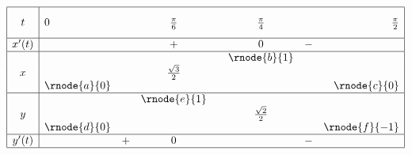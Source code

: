 \documentclass[12pt,a4paper]{article}
\begin{document}
$$
\begin{array}{|c|lcccccr|}
\hline
\rule[-4mm]{0mm}{10mm}t&0& &\frac{\pi}{6}& &\frac{\pi}{4}& &\frac{\pi}{2}\\
\hline
x'(t)& & &+& &0&-& \\
\hline
 & & & & &\rnode{b}{1}& & \\
x& & &\frac{\sqrt{3}}{2}& & & & \\
 &\rnode{a}{0}& & & & & &\rnode{c}{0}\\
\hline
 & & &\rnode{e}{1}& & & & \\
y& & & & &\frac{\sqrt{2}}{2}& & \\
 &\rnode{d}{0}& & & & & &\rnode{f}{-1}\\
\hline 
y'(t)& &+&0& & &-& \\
\hline
\end{array}
$$

\end{document}
